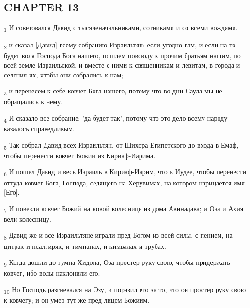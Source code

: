 \subsection{CHAPTER 13}
\begin{tcolorbox}
\textsubscript{1} И советовался Давид с тысяченачальниками, сотниками и со всеми вождями,
\end{tcolorbox}
\begin{tcolorbox}
\textsubscript{2} и сказал [Давид] всему собранию Израильтян: если угодно вам, и если на то будет воля Господа Бога нашего, пошлем повсюду к прочим братьям нашим, по всей земле Израильской, и вместе с ними к священникам и левитам, в города и селения их, чтобы они собрались к нам;
\end{tcolorbox}
\begin{tcolorbox}
\textsubscript{3} и перенесем к себе ковчег Бога нашего, потому что во дни Саула мы не обращались к нему.
\end{tcolorbox}
\begin{tcolorbox}
\textsubscript{4} И сказало все собрание: 'да будет так', потому что это дело всему народу казалось справедливым.
\end{tcolorbox}
\begin{tcolorbox}
\textsubscript{5} Так собрал Давид всех Израильтян, от Шихора Египетского до входа в Емаф, чтобы перенести ковчег Божий из Кириаф-Иарима.
\end{tcolorbox}
\begin{tcolorbox}
\textsubscript{6} И пошел Давид и весь Израиль в Кириаф-Иарим, что в Иудее, чтобы перенести оттуда ковчег Бога, Господа, седящего на Херувимах, на котором нарицается имя [Его].
\end{tcolorbox}
\begin{tcolorbox}
\textsubscript{7} И повезли ковчег Божий на новой колеснице из дома Авинадава; и Оза и Ахия вели колесницу.
\end{tcolorbox}
\begin{tcolorbox}
\textsubscript{8} Давид же и все Израильтяне играли пред Богом из всей силы, с пением, на цитрах и псалтирях, и тимпанах, и кимвалах и трубах.
\end{tcolorbox}
\begin{tcolorbox}
\textsubscript{9} Когда дошли до гумна Хидона, Оза простер руку свою, чтобы придержать ковчег, ибо волы наклонили его.
\end{tcolorbox}
\begin{tcolorbox}
\textsubscript{10} Но Господь разгневался на Озу, и поразил его за то, что он простер руку свою к ковчегу; и он умер тут же пред лицем Божиим.
\end{tcolorbox}
